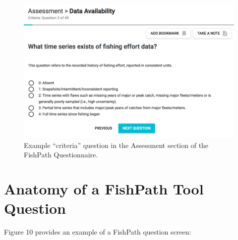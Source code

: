 \documentclass[11pt,]{book}
\begin{document}
\begin{figure}
 
 {\centering \includegraphics[width=0.95\linewidth]{images/ex-crit-question} 
 
 }
 
 \caption{Example “criteria” question in the Assessment section of the FishPath Questionnaire.}\label{fig:ex-crit-question}
 \end{figure}

\hypertarget{anatomy-of-a-fishpath-tool-question}{%
\section{Anatomy of a FishPath Tool
Question}\label{anatomy-of-a-fishpath-tool-question}}

Figure 10 provides an example of a FishPath question screen:
\end{document}
